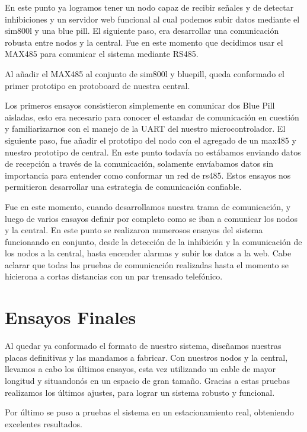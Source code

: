 En este punto ya logramos tener un nodo capaz de recibir señales y de detectar inhibiciones y un servidor web funcional al cual podemos subir datos
mediante el sim800l y una blue pill. El siguiente paso, era desarrollar una comunicación robusta entre nodos y la central. Fue en este momento que decidimos
usar el MAX485 para comunicar el sistema mediante RS485.\par
Al añadir el MAX485 al conjunto de sim800l y bluepill, queda conformado el primer prototipo en protoboard de nuestra central.\par
Los primeros ensayos consistieron simplemente en comunicar dos Blue Pill aisladas, esto era necesario para conocer el estandar de comunicación en cuestión
y familiarizarnos con el manejo de la UART del nuestro microcontrolador. El siguiente paso, fue añadir el prototipo del nodo con el agregado de un max485
y nuestro prototipo de central. En este punto todavía no estábamos enviando datos de recepción a través de la comunicación, solamente envíabamos datos
sin importancia para entender como conformar un red de rs485. Estos ensayos nos permitieron desarrollar una estrategia de comunicación confiable.\par
Fue en este momento, cuando desarrollamos nuestra trama de comunicación, y luego de varios ensayos definir por completo como se iban a comunicar los nodos
y la central. En este punto se realizaron numerosos ensayos del sistema funcionando en conjunto, desde la detección de la inhibición y la comunicación de los nodos
a la central, hasta encender alarmas y subir los datos a la web.
Cabe aclarar que todas las pruebas de comunicación realizadas hasta el momento se hicierona a cortas distancias con un par trensado telefónico.

\section{Ensayos Finales}

Al quedar ya conformado el formato de nuestro sistema, diseñamos nuestras placas definitivas y las mandamos a fabricar. Con nuestros nodos y la central,
llevamos a cabo los últimos ensayos, esta vez utilizando un cable de mayor longitud y situandonós en un espacio de gran tamaño.
Gracias a estas pruebas realizamos los últimos ajustes, para lograr un sistema robusto y funcional. \par
Por último se puso a pruebas el sistema en un estacionamiento real, obteniendo excelentes resultados.



